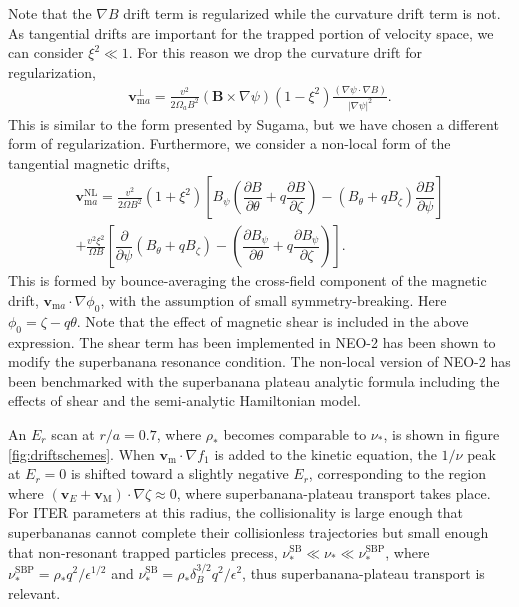 \documentclass[aip, pop, preprint]{revtex4-1}
\numberwithin{figure}{section}
\numberwithin{equation}{section}
\newcommand{\partder}[2]{\dfrac{\partial  #1}{\partial  #2}} %
\begin{document}
Note that the $\nabla B$ drift term is regularized while the curvature drift term is not. As tangential drifts are important for the trapped portion of velocity space, we can consider $\xi^2 \ll 1$. For this reason we drop the curvature drift for regularization,
\begin{gather}
\bm{v}_{\mathrm{m}a}^{\perp} = \frac{v^2}{2\Omega_aB^2} (\bm{B} \times \nabla \psi) (1 - \xi^2) \frac{(\nabla \psi \cdot \nabla B)}{\rvert \nabla \psi \rvert^2}.
\label{eq:mds5}
\end{gather}
This is similar to the form presented by Sugama,\cite{Sugama2016} but we have chosen a different form of regularization. Furthermore, we consider a non-local form of the tangential magnetic drifts,
\begin{multline}
\bm{v}_{\mathrm{m}a}^{\mathrm{NL}} = \frac{v^2}{2\Omega B^2} (1 + \xi^2) \left[ B_{\psi}\left( \partder{B}{\theta} + q \partder{B}{\zeta} \right) - (B_{\theta} + q B_{\zeta}) \partder{B}{\psi} \right] \\ + \frac{v^2 \xi^2}{\Omega B} \left[\partder{}{\psi} (B_{\theta} + q B_{\zeta}) - \left( \partder{B_{\psi}}{\theta} + q \partder{B_{\psi}}{\zeta} \right)\right]. 
\end{multline}
This is formed by bounce-averaging the cross-field component of the magnetic drift, $\bm{v}_{\mathrm{m}a} \cdot \nabla \phi_0$, with the assumption of small symmetry-breaking. Here $\phi_0 = \zeta - q \theta$. Note that the effect of magnetic shear is included in the above expression. The shear term has been implemented in NEO-2 has been shown to modify the superbanana resonance condition.\cite{Albert2016} The non-local version of NEO-2 has been benchmarked\cite{Martitsch2016} with the superbanana plateau analytic formula including the effects of shear\cite{Shaing2015} and the semi-analytic Hamiltonian model.\cite{Albert2016}

An $E_r$ scan at $r/a = 0.7$, where $\rho_*$ becomes comparable to $\nu_*$, is shown in figure \ref{fig:driftschemes}. When $\bm{v}_{\mathrm{m}} \cdot \nabla f_1$ is added to the kinetic equation, the $1/\nu$ peak at $E_r = 0$ is shifted toward a slightly negative $E_r$, corresponding to the region where $(\bm{v}_E + \bm{v}_\mathrm{M})\cdot \nabla \zeta \approx 0$, where superbanana-plateau transport takes place. For ITER parameters at this radius, the collisionality is large enough that superbananas cannot complete their collisionless trajectories but small enough that non-resonant trapped particles precess, $\nu_*^{\mathrm{SB}} \ll \nu_* \ll \nu_*^{\mathrm{SBP}}$, where $\nu_*^{\mathrm{SBP}} = \rho_*q^2/\epsilon^{1/2}$ and $\nu_*^{\mathrm{SB}} = \rho_* \delta_B^{3/2} q^2/\epsilon^2$,\cite{Shaing2009_sb, Shaing2009_sbp} thus superbanana-plateau transport is relevant.
\end{document}
